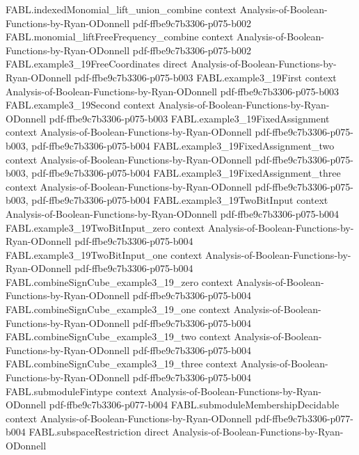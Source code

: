 \begin{theorem}
\proofstep
  {FABL.indexedMonomial_lift_union_combine}
  {context}
  {Analysis-of-Boolean-Functions-by-Ryan-ODonnell}
  {pdf-ffbe9c7b3306-p075-b002}
\proofstep
  {FABL.monomial_liftFreeFrequency_combine}
  {context}
  {Analysis-of-Boolean-Functions-by-Ryan-ODonnell}
  {pdf-ffbe9c7b3306-p075-b002}
\proofstep
  {FABL.example3_19FreeCoordinates}
  {direct}
  {Analysis-of-Boolean-Functions-by-Ryan-ODonnell}
  {pdf-ffbe9c7b3306-p075-b003}
\proofstep
  {FABL.example3_19First}
  {context}
  {Analysis-of-Boolean-Functions-by-Ryan-ODonnell}
  {pdf-ffbe9c7b3306-p075-b003}
\proofstep
  {FABL.example3_19Second}
  {context}
  {Analysis-of-Boolean-Functions-by-Ryan-ODonnell}
  {pdf-ffbe9c7b3306-p075-b003}
\proofstep
  {FABL.example3_19FixedAssignment}
  {context}
  {Analysis-of-Boolean-Functions-by-Ryan-ODonnell}
  {pdf-ffbe9c7b3306-p075-b003,
    pdf-ffbe9c7b3306-p075-b004}
\proofstep
  {FABL.example3_19FixedAssignment_two}
  {context}
  {Analysis-of-Boolean-Functions-by-Ryan-ODonnell}
  {pdf-ffbe9c7b3306-p075-b003,
    pdf-ffbe9c7b3306-p075-b004}
\proofstep
  {FABL.example3_19FixedAssignment_three}
  {context}
  {Analysis-of-Boolean-Functions-by-Ryan-ODonnell}
  {pdf-ffbe9c7b3306-p075-b003,
    pdf-ffbe9c7b3306-p075-b004}
\proofstep
  {FABL.example3_19TwoBitInput}
  {context}
  {Analysis-of-Boolean-Functions-by-Ryan-ODonnell}
  {pdf-ffbe9c7b3306-p075-b004}
\proofstep
  {FABL.example3_19TwoBitInput_zero}
  {context}
  {Analysis-of-Boolean-Functions-by-Ryan-ODonnell}
  {pdf-ffbe9c7b3306-p075-b004}
\proofstep
  {FABL.example3_19TwoBitInput_one}
  {context}
  {Analysis-of-Boolean-Functions-by-Ryan-ODonnell}
  {pdf-ffbe9c7b3306-p075-b004}
\proofstep
  {FABL.combineSignCube_example3_19_zero}
  {context}
  {Analysis-of-Boolean-Functions-by-Ryan-ODonnell}
  {pdf-ffbe9c7b3306-p075-b004}
\proofstep
  {FABL.combineSignCube_example3_19_one}
  {context}
  {Analysis-of-Boolean-Functions-by-Ryan-ODonnell}
  {pdf-ffbe9c7b3306-p075-b004}
\proofstep
  {FABL.combineSignCube_example3_19_two}
  {context}
  {Analysis-of-Boolean-Functions-by-Ryan-ODonnell}
  {pdf-ffbe9c7b3306-p075-b004}
\proofstep
  {FABL.combineSignCube_example3_19_three}
  {context}
  {Analysis-of-Boolean-Functions-by-Ryan-ODonnell}
  {pdf-ffbe9c7b3306-p075-b004}
\proofstep
  {FABL.submoduleFintype}
  {context}
  {Analysis-of-Boolean-Functions-by-Ryan-ODonnell}
  {pdf-ffbe9c7b3306-p077-b004}
\proofstep
  {FABL.submoduleMembershipDecidable}
  {context}
  {Analysis-of-Boolean-Functions-by-Ryan-ODonnell}
  {pdf-ffbe9c7b3306-p077-b004}
\proofstep
  {FABL.subspaceRestriction}
  {direct}
  {Analysis-of-Boolean-Functions-by-Ryan-ODonnell}

\end{theorem}
